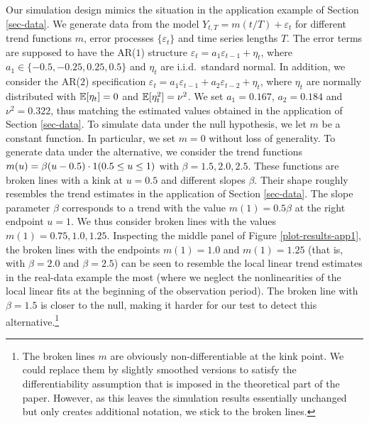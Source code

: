 Our simulation design mimics the situation in the application example of Section \ref{sec-data}. We generate data from the model $Y_{t,T} = m(t/T) + \varepsilon_t$ for different trend functions $m$, error processes $\{\varepsilon_t\}$ and time series lengths $T$. The error terms are supposed to have the AR($1$) structure $\varepsilon_t = a_1 \varepsilon_{t-1} + \eta_t$, where $a_1 \in \{-0.5,-0.25,0.25,0.5\}$ and $\eta_t$ are i.i.d.\ standard normal. In addition, we consider the AR($2$) specification $\varepsilon_t = a_1 \varepsilon_{t-1} + a_2 \varepsilon_{t-2} + \eta_t$, where $\eta_t$ are normally distributed with $\mathbb{E}[\eta_t] = 0$ and $\mathbb{E}[\eta_t^2] = \nu^2$. We set $a_1 = 0.167$, $a_2 = 0.184$ and $\nu^2 = 0.322$, thus matching the estimated values obtained in the application of Section \ref{sec-data}. To simulate data under the null hypothesis, we let $m$ be a constant function. In particular, we set $m = 0$ without loss of generality. To generate data under the alternative, we consider the trend functions $m(u) = \beta (u - 0.5) \cdot 1(0.5 \le u \le 1)$ with $\beta = 1.5,2.0,2.5$. These functions are broken lines with a kink at $u = 0.5$ and different slopes $\beta$. Their shape roughly resembles the trend estimates in the application of Section \ref{sec-data}. The slope parameter $\beta$ corresponds to a trend with the value $m(1) = 0.5 \beta$ at the right endpoint $u = 1$. We thus consider broken lines with the values $m(1) = 0.75, 1.0, 1.25$. Inspecting the middle panel of Figure \ref{plot-results-app1}, the broken lines with the endpoints $m(1) = 1.0$ and $m(1) = 1.25$ (that is, with $\beta = 2.0$ and $\beta = 2.5$) can be seen to resemble the local linear trend estimates in the real-data example the most (where we neglect the nonlinearities of the local linear fits at the beginning of the observation period). The broken line with $\beta = 1.5$ is closer to the null, making it harder for our test to detect this alternative.\footnote{The broken lines $m$ are obviously non-differentiable at the kink point. We could replace them by slightly smoothed versions to satisfy the differentiability assumption that is imposed in the theoretical part of the paper. However, as this leaves the simulation results essentially unchanged but only creates additional notation, we stick to the broken lines.}



